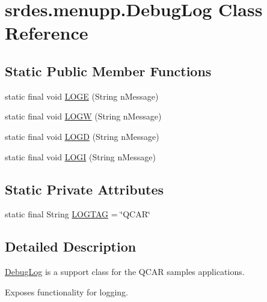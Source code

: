 \hypertarget{classsrdes_1_1menupp_1_1_debug_log}{\section{srdes.\-menupp.\-Debug\-Log \-Class \-Reference}
\label{classsrdes_1_1menupp_1_1_debug_log}
}
\subsection*{\-Static \-Public \-Member \-Functions}
\begin{DoxyCompactItemize}
\item 
static final void \hyperlink{classsrdes_1_1menupp_1_1_debug_log_a8490c62eaa744128f43e4a180e7d3015}{\-L\-O\-G\-E} (\-String n\-Message)
\item 
static final void \hyperlink{classsrdes_1_1menupp_1_1_debug_log_aa5b0150e78c2a87e58291cbdd24acefc}{\-L\-O\-G\-W} (\-String n\-Message)
\item 
static final void \hyperlink{classsrdes_1_1menupp_1_1_debug_log_adcb15d1b35526748ad1278d08cd1f227}{\-L\-O\-G\-D} (\-String n\-Message)
\item 
static final void \hyperlink{classsrdes_1_1menupp_1_1_debug_log_aa0445826f2eeb00da266490f6333673e}{\-L\-O\-G\-I} (\-String n\-Message)
\end{DoxyCompactItemize}
\subsection*{\-Static \-Private \-Attributes}
\begin{DoxyCompactItemize}
\item 
static final \-String \hyperlink{classsrdes_1_1menupp_1_1_debug_log_a8c52eedc5e7444448120ce6bd78fc65e}{\-L\-O\-G\-T\-A\-G} = \char`\"{}\-Q\-C\-A\-R\char`\"{}
\end{DoxyCompactItemize}


\subsection{\-Detailed \-Description}
\hyperlink{classsrdes_1_1menupp_1_1_debug_log}{\-Debug\-Log} is a support class for the \-Q\-C\-A\-R samples applications.

\-Exposes functionality for logging. 

